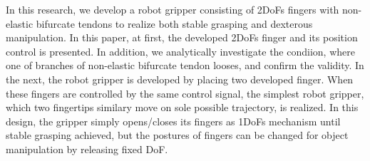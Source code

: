 \documentclass{llncs}
\begin{document}
In this research, we develop a robot gripper consisting of 2DoFs fingers
with non-elastic bifurcate tendons to realize both stable grasping and
dexterous manipulation.
In this paper, at first, the developed 2DoFs finger and its position
control is presented.
In addition, we analytically investigate the condiion, where one of
branches of non-elastic bifurcate tendon looses, and confirm the
validity.
In the next, the robot gripper is developed by placing two developed
finger.
When these fingers are controlled by the same control signal, the
simplest robot gripper, which two fingertips similary move on sole
possible trajectory, is realized.
In this design, the gripper simply opens/closes its fingers as 1DoFs
mechanism until stable grasping achieved, but the postures of fingers
can be changed for object manipulation by releasing fixed DoF.
\end{document}
